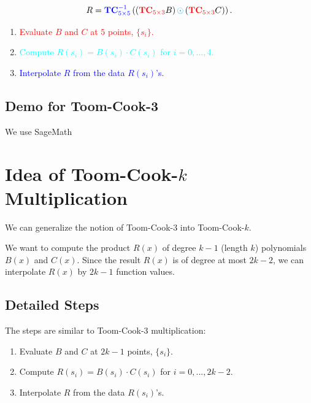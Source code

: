 \documentclass[
11pt,notheorems,hyperref={pdfauthor=whatever}
]{beamer}
\begin{document}
\begin{frame}
    \[
        R =\textcolor{blue}{\mathbf{TC}_{5 \times 5}^{-1}}
        \left(
            \left(
                \textcolor{red}{\mathbf{TC}_{5 \times 3}} B
            \right) \textcolor{cyan}{\odot}\left(
                \textcolor{red}{\mathbf{TC}_{5 \times 3}} C
            \right)
        \right) .
    \]
    \begin{enumerate}
        \item \textcolor{red}{Evaluate $B$ and $C$ at $5$ points,  $\{ s_{i} \}$.}
        \item \textcolor{cyan}{Compute $R(s_{i}) = B(s_{i}) \cdot C(s_{i})$ for $i=0,...,4$.}
        \item \textcolor{blue}{Interpolate $R$ from the data $R(s_{i})$'s.}
    \end{enumerate}
\end{frame}

\subsection{Demo for Toom-Cook-3}

\begin{frame}
    We use SageMath
\end{frame}

\section{Idea of Toom-Cook-$k$ Multiplication}
\begin{frame}
We can generalize the notion of Toom-Cook-3 into Toom-Cook-$k$.

We want to compute the product $R(x)$ of degree $k-1$ (length $k$) polynomials $B(x)$ and $C(x)$.
Since the result $R(x)$ is of degree at most $2k-2$, we can interpolate $R(x)$ by $2k-1$ function values.
\end{frame}
\subsection{Detailed Steps}
\begin{frame}
    The steps are similar to Toom-Cook-3 multiplication:
    \begin{enumerate}
        \item Evaluate $B$ and $C$ at $2k-1$ points, $\{ s_{i} \}$.
        \item Compute $R(s_{i}) = B(s_{i}) \cdot C(s_{i})$ for $i=0,...,2k-2$.
        \item Interpolate $R$ from the data $R(s_{i})$'s.
    \end{enumerate}
\end{frame}
\end{document}
